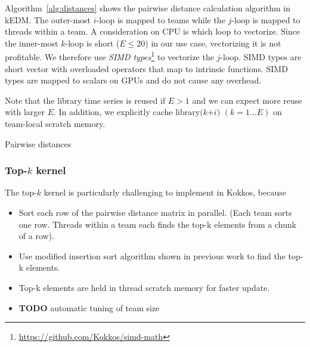 \documentclass[conference]{IEEEtran}
\begin{document}
Algorithm~\ref{alg:distances} shows the pairwise distance calculation
algorithm in kEDM\@. The outer-most $i$-loop is mapped to teams while the
$j$-loop is mapped to threads within a team. A consideration on CPU is which
loop to vectorize. Since the inner-most $k$-loop is short ($E \leq 20$) in our
use case, vectorizing it is not profitable. We therefore use \textit{SIMD
types}\footnote{\url{https://github.com/Kokkos/simd-math}} to vectorize the
$j$-loop. SIMD types are short vector with overloaded operators that map to
intrinsic functions. SIMD types are mapped to scalars on GPUs and do not cause
any overhead.

Note that the library time series is reused if $E > 1$ and we can expect
more reuse with larger $E$. In addition, we explicitly cache $\mathrm{library}
(k $\texttau$ + i)$ $(k=1 \dots E)$ on team-local scratch memory.

\begin{algorithm}
    \SetAlgoLined
    \DontPrintSemicolon
    \caption{Pairwise distances}%
    \label{alg:distances}
\end{algorithm}

\subsubsection{Top-$k$ kernel}

The top-$k$ kernel is particularly challenging to implement in Kokkos, because

\begin{itemize}
\item Sort each row of the pairwise distance matrix in parallel. (Each team sorts one row. Threads within a team each finds the top-k elements from a chunk of a row).
\item Use modified insertion sort algorithm shown in previous work to find the top-k elements.
\item Top-k elements are held in thread scratch memory for faster update.
\item \textbf{TODO} automatic tuning of team size
\end{itemize}
\end{document}
